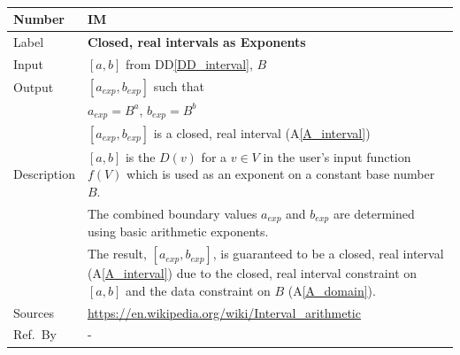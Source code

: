 \documentclass[12pt]{article}
\newcommand{\colAwidth}{0.13\textwidth}
\newcommand{\colBwidth}{0.82\textwidth}
\newcommand{\ddref}[1]{DD\ref{#1}}
\newcommand{\aref}[1]{A\ref{#1}}
\newcounter{instnum} %
\begin{document}
~\newline

\noindent
\begin{minipage}{\textwidth}
	\renewcommand*{\arraystretch}{1.5}
	\begin{tabular}{| p{\colAwidth} | p{\colBwidth}|}
		\hline
		\rowcolor[gray]{0.9}
		Number& IM{instnum}\theinstnum \label{I_exponents}\\
		\hline
		Label& \bf  Closed, real intervals as Exponents\\
		\hline
		Input&$[a, b]$ from \ddref{DD_interval}, $B$\\
		\hline
		Output&$[a_{exp}, b_{exp}]$ such that\\
		&$a_{exp} = B^a$, $b_{exp} = B^b$\\
		&$[a_{exp}, b_{exp}]$ is a closed, real interval (\aref{A_interval}) \\
		\hline
		Description&$[a, b]$ is the $D(v)$ for a $v \in V$ in the user's input 
		function $f(V)$ which is used as an exponent on a constant base number 
		$B$. \\
		&The combined boundary values $a_{exp}$ and $b_{exp}$ are determined 
		using basic arithmetic exponents.\\
		& The result, $[a_{exp}, b_{exp}]$, is guaranteed to be a closed, real 
		interval (\aref{A_interval}) due to the closed, real interval 
		constraint on $[a, b]$ and the data constraint on $B$ (\aref{A_domain}).
		\\
		\hline
		Sources& \url{https://en.wikipedia.org/wiki/Interval_arithmetic} \\
		\hline
		Ref.\ By & -\\
		\hline
	\end{tabular}
\end{minipage}\\

~\newline
\end{document}
